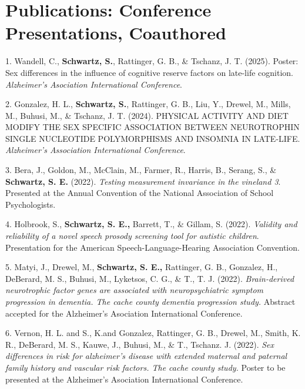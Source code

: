 \documentclass[11pt,a4paper,]{moderncv}
\newlength{\cslhangindent}
\newenvironment{CSLReferences}[2] %
 {\begin{list}{}{%
  \setlength{\itemindent}{0pt}
  \setlength{\leftmargin}{0pt}
  \setlength{\parsep}{0pt}
  \ifodd #1
   \setlength{\leftmargin}{\cslhangindent}
   \setlength{\itemindent}{-1\cslhangindent}
  \fi
  \setlength{\itemsep}{#2\baselineskip}}}
 {\end{list}}
\begin{document}
\endgroup

\vspace{7mm}

\section{Publications: Conference Presentations,
Coauthored}\label{publications-conference-presentations-coauthored}

\begingroup
\setlength{\parindent}{-0.5in}
\setlength{\leftskip}{0.5in}

\label{refs-3bbbb43a2710a807e93fc984a49ba589}
\begin{CSLReferences}{1}{0}
1. Wandell, C., \textbf{Schwartz, S.}, Rattinger, G. B., \& Tschanz, J.
T. (2025). Poster: Sex differences in the influence of cognitive reserve
factors on late-life cognition. \emph{Alzheimer's Asociation
International Conference}.

2. Gonzalez, H. L., \textbf{Schwartz, S.}, Rattinger, G. B., Liu, Y.,
Drewel, M., Mills, M., Buhusi, M., \& Tschanz, J. T. (2024). PHYSICAL
ACTIVITY AND DIET MODIFY THE SEX SPECIFIC ASSOCIATION BETWEEN
NEUROTROPHIN SINGLE NUCLEOTIDE POLYMORPHISMS AND INSOMNIA IN LATE-LIFE.
\emph{Alzheimer's Association International Conference}.

3. Bera, J., Goldon, M., McClain, M., Farmer, R., Harris, B., Serang,
S., \& \textbf{Schwartz, S. E.} (2022). \emph{Testing measurement
invariance in the vineland 3}. Presented at the Annual Convention of the
National Association of School Psychologists.

4. Holbrook, S., \textbf{Schwartz, S. E.,} Barrett, T., \& Gillam, S.
(2022). \emph{Validity and reliability of a novel speech prosody
screening tool for autistic children}. Presentation for the American
Speech-Language-Hearing Association Convention.

5. Matyi, J., Drewel, M., \textbf{Schwartz, S. E.,} Rattinger, G. B.,
Gonzalez, H., DeBerard, M. S., Buhusi, M., Lyketsos, C. G., \& T., T. J.
(2022). \emph{Brain-derived neurotrophic factor genes are associated
with neuropsychiatric symptom progression in dementia. The cache county
dementia progression study.} Abstract accepted for the Alzheimer's
Asociation International Conference.

6. Vernon, H. L. and S., K.and Gonzalez, Rattinger, G. B., Drewel, M.,
Smith, K. R., DeBerard, M. S., Kauwe, J., Buhusi, M., \& T., Tschanz. J.
(2022). \emph{Sex differences in risk for alzheimer's disease with
extended maternal and paternal family history and vascular risk factors.
The cache county study.} Poster to be presented at the Alzheimer's
Asociation International Conference.


\end{CSLReferences}
\end{document}
